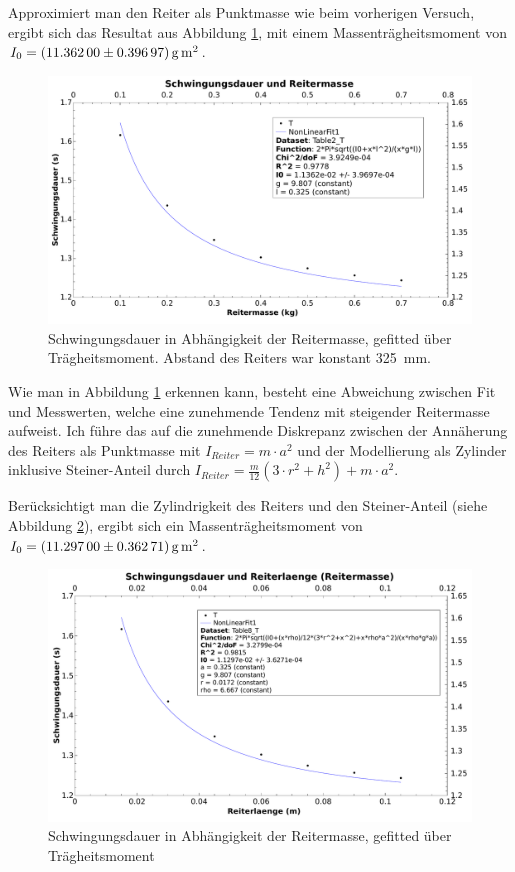Approximiert  man  den Reiter  als  Punktmasse  wie beim  vorherigen  Versuch,
ergibt   sich   das  Resultat   aus   Abbildung   \ref{fig:312a},  mit   einem
Massentr\"agheitsmoment von
$I_0  = \SI[separate-uncertainty = true]{11.362 \pm 0.39697}{\gram\meter\squared}$.
\begin{figure}[h!]
    \centering
    \includegraphics[width=\textwidth]{images/312.pdf}
    \caption{%
        Schwingungsdauer in Abh\"angigkeit der Reitermasse, gefitted \"uber Tr\"agheitsmoment. Abstand des Reiters war konstant \SI{325}{\milli\meter}.
    }
    \label{fig:312a}
\end{figure}

Wie man  in Abbildung  \ref{fig:312a} erkennen  kann, besteht  eine Abweichung
zwischen Fit  und Messwerten,  welche eine  zunehmende Tendenz  mit steigender
Reitermasse aufweist. Ich  f\"uhre das auf die  zunehmende Diskrepanz zwischen
der Ann\"aherung des Reiters als Punktmasse  mit $I_{Reiter} = m\cdot a^2$ und
der Modellierung als Zylinder inklusive Steiner-Anteil durch
$I_{Reiter} = \frac{m}{12}(3  \cdot r^2  + h^2) +  m \cdot a^2$.

Ber\"ucksichtigt  man die  Zylindrigkeit  des Reiters  und den  Steiner-Anteil
(siehe Abbildung \ref{fig:312b}), ergibt sich ein Massentr\"agheitsmoment von
$I_0  = \SI[separate-uncertainty = true]{11.297 \pm 0.36271}{\gram\meter\squared}$.

\begin{figure}[h!]
    \centering
    \includegraphics[width=\textwidth]{images/312b.pdf}
    \caption{%
        Schwingungsdauer in Abh\"angigkeit der Reitermasse, gefitted \"uber Tr\"agheitsmoment
    }
    \label{fig:312b}
\end{figure}

